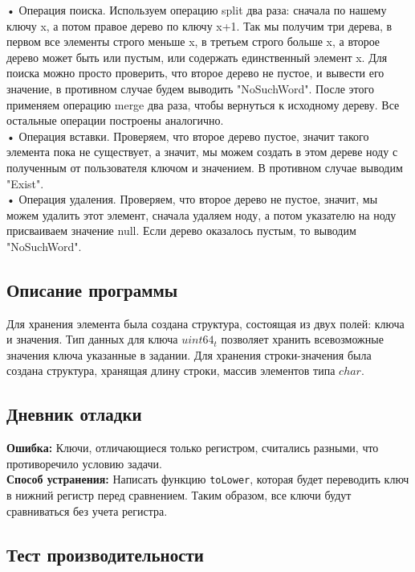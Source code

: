 \documentclass[12pt]{article}
\begin{document}
• Операция поиска. Используем операцию split два раза: сначала по нашему ключу
x, а потом правое дерево по ключу x+1. Так мы получим три дерева, в первом все
элементы строго меньше x, в третьем строго больше x, а второе дерево может быть
или пустым, или содержать единственный элемент x. Для поиска можно просто
проверить, что второе дерево не пустое, и вывести его значение, в противном
случае будем выводить "NoSuchWord". После этого применяем операцию merge
два раза, чтобы вернуться к исходному дереву. Все остальные операции построены
аналогично. \\
• Операция вставки. Проверяем, что второе дерево пустое, значит такого элемента
пока не существует, а значит, мы можем создать в этом дереве ноду с полученным
от пользователя ключом и значением. В противном случае выводим "Exist".\\
• Операция удаления. Проверяем, что второе дерево не пустое, значит, мы можем
удалить этот элемент, сначала удаляем ноду, а потом указателю на ноду присваиваем
значение null. Если дерево оказалось пустым, то выводим "NoSuchWord".\\


\subsection*{Описание программы}

Для хранения элемента была создана структура, состоящая из двух полей: ключа и значения.
Тип данных для ключа $uint64_t$ позволяет хранить всевозможные значения ключа указанные в задании. 
Для хранения строки-значения была создана структура, хранящая длину строки, массив элементов типа $char$.


\subsection*{Дневник отладки}

\textbf{Ошибка:} Ключи, отличающиеся только регистром, считались разными, что противоречило условию задачи. \\


\textbf{Способ устранения:} Написать функцию \texttt{toLower}, которая будет переводить ключ в нижний регистр перед сравнением. Таким образом, все ключи будут сравниваться без учета регистра.


\subsection*{Тест производительности}
\end{document}
